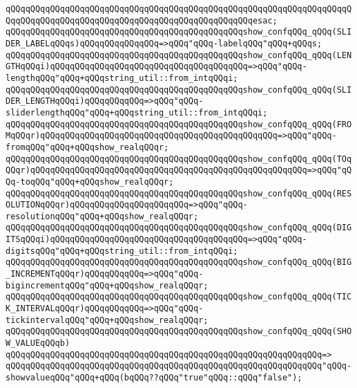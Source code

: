 \verb|qQQqqQQqqQQqqQQqqQQqqQQqqQQqqQQqqQQqqQQqqQQqqQQqqQQqqQQqqQQqqQQqqQQqqQQqqQQqqQQqqQQqqQQqqQQqqQQqqQQqqQQqqQQqqQQqqQQqqQQqesac;|\newline
\newline
\verb|qQQqqQQqqQQqqQQqqQQqqQQqqQQqqQQqqQQqqQQqqQQqqQQqshow_confqQQq_qQQq(SLIDER_LABELqQQqs)qQQqqQQqqQQqqQQq=>qQQq"qQQq-labelqQQq"qQQq+qQQqs;|\newline
\verb|qQQqqQQqqQQqqQQqqQQqqQQqqQQqqQQqqQQqqQQqqQQqqQQqshow_confqQQq_qQQq(LENGTHqQQqi)qQQqqQQqqQQqqQQqqQQqqQQqqQQqqQQqqQQqqQQq=>qQQq"qQQq-lengthqQQq"qQQq+qQQqstring_util::from_intqQQqi;|\newline
\verb|qQQqqQQqqQQqqQQqqQQqqQQqqQQqqQQqqQQqqQQqqQQqqQQqshow_confqQQq_qQQq(SLIDER_LENGTHqQQqi)qQQqqQQqqQQq=>qQQq"qQQq-sliderlengthqQQq"qQQq+qQQqstring_util::from_intqQQqi;|\newline
\verb|qQQqqQQqqQQqqQQqqQQqqQQqqQQqqQQqqQQqqQQqqQQqqQQqshow_confqQQq_qQQq(FROMqQQqr)qQQqqQQqqQQqqQQqqQQqqQQqqQQqqQQqqQQqqQQqqQQqqQQq=>qQQq"qQQq-fromqQQq"qQQq+qQQqshow_realqQQqr;|\newline
\verb|qQQqqQQqqQQqqQQqqQQqqQQqqQQqqQQqqQQqqQQqqQQqqQQqshow_confqQQq_qQQq(TOqQQqr)qQQqqQQqqQQqqQQqqQQqqQQqqQQqqQQqqQQqqQQqqQQqqQQqqQQqqQQq=>qQQq"qQQq-toqQQq"qQQq+qQQqshow_realqQQqr;|\newline
\verb|qQQqqQQqqQQqqQQqqQQqqQQqqQQqqQQqqQQqqQQqqQQqqQQqshow_confqQQq_qQQq(RESOLUTIONqQQqr)qQQqqQQqqQQqqQQqqQQqqQQq=>qQQq"qQQq-resolutionqQQq"qQQq+qQQqshow_realqQQqr;|\newline
\verb|qQQqqQQqqQQqqQQqqQQqqQQqqQQqqQQqqQQqqQQqqQQqqQQqshow_confqQQq_qQQq(DIGITSqQQqi)qQQqqQQqqQQqqQQqqQQqqQQqqQQqqQQqqQQqqQQq=>qQQq"qQQq-digitsqQQq"qQQq+qQQqstring_util::from_intqQQqi;|\newline
\verb|qQQqqQQqqQQqqQQqqQQqqQQqqQQqqQQqqQQqqQQqqQQqqQQqshow_confqQQq_qQQq(BIG_INCREMENTqQQqr)qQQqqQQqqQQq=>qQQq"qQQq-bigincrementqQQq"qQQq+qQQqshow_realqQQqr;|\newline
\verb|qQQqqQQqqQQqqQQqqQQqqQQqqQQqqQQqqQQqqQQqqQQqqQQqshow_confqQQq_qQQq(TICK_INTERVALqQQqr)qQQqqQQqqQQq=>qQQq"qQQq-tickintervalqQQq"qQQq+qQQqshow_realqQQqr;|\newline
\newline
\verb|qQQqqQQqqQQqqQQqqQQqqQQqqQQqqQQqqQQqqQQqqQQqqQQqshow_confqQQq_qQQq(SHOW_VALUEqQQqb)|\newline
\verb|qQQqqQQqqQQqqQQqqQQqqQQqqQQqqQQqqQQqqQQqqQQqqQQqqQQqqQQqqQQqqQQq=>|\newline
\verb|qQQqqQQqqQQqqQQqqQQqqQQqqQQqqQQqqQQqqQQqqQQqqQQqqQQqqQQqqQQqqQQq"qQQq-showvalueqQQq"qQQq+qQQq(bqQQq??qQQq"true"qQQq::qQQq"false");|\newline
